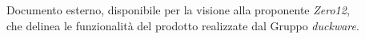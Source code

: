 Documento esterno, disponibile per la visione alla proponente \emph{Zero12}, \\che delinea le funzionalità del prodotto realizzate dal Gruppo \emph{duckware}.